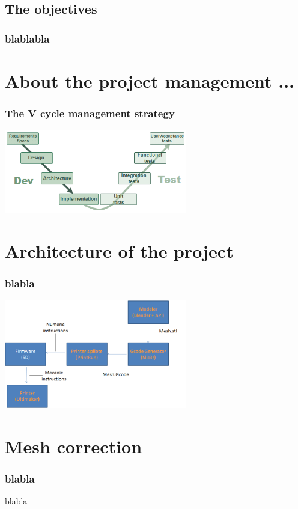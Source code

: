 \documentclass{beamer}
\begin{document}
\subsection{The objectives}
\begin{frame}
	\frametitle{blablabla}
    
\end{frame}

\section{About the project management ...}
\begin{frame}
	\frametitle{The V cycle management strategy}

    \begin{center}
		\includegraphics[width=8cm]{VCycle}	
	\end{center}
\end{frame}

\section{Architecture of the project}
\begin{frame}
	\frametitle{blabla}

    \begin{center}
		\includegraphics[width=8cm]{ARD1}	
	\end{center}
	
\end{frame}

\section{Mesh correction}
\begin{frame}
	\frametitle{blabla}

    \begin{block}{blabla}
    \end{block}
\end{frame}
\end{document}
